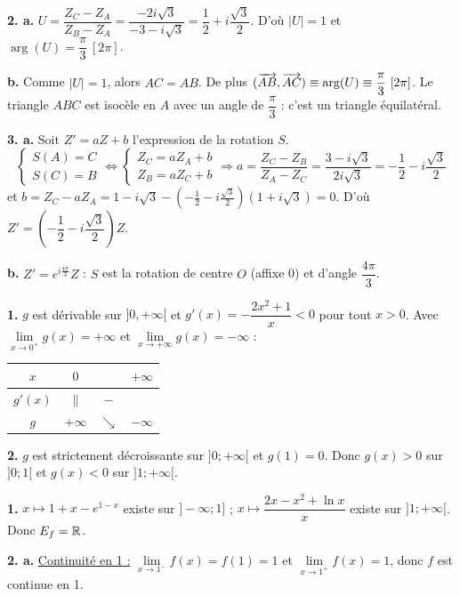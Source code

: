 \documentclass[11pt]{article}
\begin{document}
\textbf{2. a.} $U = \dfrac{Z_C - Z_A}{Z_B - Z_A} = \dfrac{-2i\sqrt{3}}{-3 - i\sqrt{3}} = \dfrac{1}{2} + i\dfrac{\sqrt{3}}{2}$. D'où $|U| = 1$ et $\arg(U) = \dfrac{\pi}{3}\ [2\pi]$.

\textbf{b.} Comme $|U| = 1$, alors $AC = AB$. De plus $(\overrightarrow{AB}, \overrightarrow{AC}) \equiv \arg(U) \equiv \dfrac{\pi}{3}\ [2\pi]$. Le triangle $ABC$ est isocèle en $A$ avec un angle de $\dfrac{\pi}{3}$ : c'est un triangle équilatéral.

\textbf{3. a.} Soit $Z' = aZ + b$ l'expression de la rotation $S$.
\[ \begin{cases} S(A) = C \\ S(C) = B \end{cases} \Longleftrightarrow \begin{cases} Z_C = aZ_A + b \\ Z_B = aZ_C + b \end{cases} \Rightarrow a = \frac{Z_C - Z_B}{Z_A - Z_C} = \frac{3 - i\sqrt{3}}{2i\sqrt{3}} = -\frac{1}{2} - i\frac{\sqrt{3}}{2} \]
et $b = Z_C - aZ_A = 1 - i\sqrt{3} - \left(-\tfrac{1}{2} - i\tfrac{\sqrt{3}}{2}\right)(1 + i\sqrt{3}) = 0$. D'où $Z' = \left(-\dfrac{1}{2} - i\dfrac{\sqrt{3}}{2}\right)Z$.

\textbf{b.} $Z' = e^{i\frac{4\pi}{3}}Z$ : $S$ est la rotation de centre $O$ (affixe 0) et d'angle $\dfrac{4\pi}{3}$.

\prob{}
\textbf{1.} $g$ est dérivable sur $]0, +\infty[$ et $g'(x) = -\dfrac{2x^2 + 1}{x} < 0$ pour tout $x > 0$. Avec $\lim\limits_{x\to 0^+} g(x) = +\infty$ et $\lim\limits_{x\to+\infty} g(x) = -\infty$ :
\begin{center}\renewcommand{\arraystretch}{1.4}
\begin{tabular}{|c|ccc|}
\hline $x$ & $0$ & & $+\infty$ \\\hline $g'(x)$ & $\|$ & $-$ & \\\hline $g$ & $+\infty$ & $\searrow$ & $-\infty$ \\\hline
\end{tabular}
\end{center}

\textbf{2.} $g$ est strictement décroissante sur $]0;+\infty[$ et $g(1) = 0$. Donc $g(x) > 0$ sur $]0;1[$ et $g(x) < 0$ sur $]1;+\infty[$.

\textbf{1.} $x \mapsto 1 + x - e^{1-x}$ existe sur $]-\infty;1]$ ; $x \mapsto \dfrac{2x - x^2 + \ln x}{x}$ existe sur $]1;+\infty[$. Donc $E_f = \mathbb{R}$.

\textbf{2. a.} \underline{Continuité en 1 :} $\lim\limits_{x\to 1^-} f(x) = f(1) = 1$ et $\lim\limits_{x\to 1^+} f(x) = 1$, donc $f$ est continue en 1.
\end{document}
